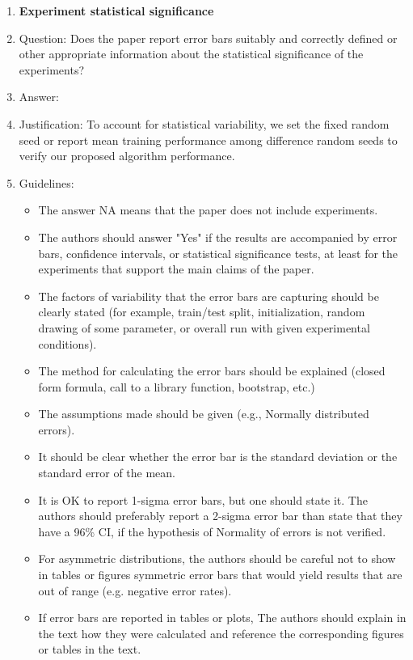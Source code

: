\documentclass{article}
\theoremstyle{remark}
\begin{document}
\begin{enumerate}
\item {\bf Experiment statistical significance}
    \item[] Question: Does the paper report error bars suitably and correctly defined or other appropriate information about the statistical significance of the experiments?
    \item[] Answer: \answerYes{} %
    \item[] Justification: To account for statistical variability, we set the fixed random seed or report mean training performance among difference random seeds to verify our proposed algorithm performance.
    \item[] Guidelines: 
    \begin{itemize}
        \item The answer NA means that the paper does not include experiments.
        \item The authors should answer "Yes" if the results are accompanied by error bars, confidence intervals, or statistical significance tests, at least for the experiments that support the main claims of the paper.
        \item The factors of variability that the error bars are capturing should be clearly stated (for example, train/test split, initialization, random drawing of some parameter, or overall run with given experimental conditions).
        \item The method for calculating the error bars should be explained (closed form formula, call to a library function, bootstrap, etc.)
        \item The assumptions made should be given (e.g., Normally distributed errors).
        \item It should be clear whether the error bar is the standard deviation or the standard error of the mean.
        \item It is OK to report 1-sigma error bars, but one should state it. The authors should preferably report a 2-sigma error bar than state that they have a 96\% CI, if the hypothesis of Normality of errors is not verified.
        \item For asymmetric distributions, the authors should be careful not to show in tables or figures symmetric error bars that would yield results that are out of range (e.g. negative error rates).
        \item If error bars are reported in tables or plots, The authors should explain in the text how they were calculated and reference the corresponding figures or tables in the text.
    \end{itemize}


\end{enumerate}
\end{document}
